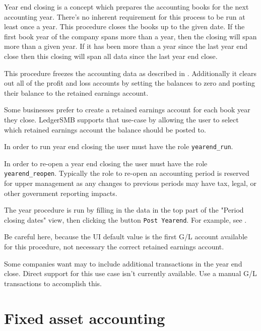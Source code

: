Year end closing is a concept which prepares the accounting books for the next
\gls{accounting year}. There's
no inherent requirement for this process to be run at least once a year. 
This procedure closes the books up to the given date. 
If the first book year of the company spans more than a year, 
then the closing will span more than a given year.
If it has been more than a year since the last year end close then
this closing will span all data since the last year end close.

This procedure freezes the accounting data as described in . Additionally it clears out all of the profit and loss accounts by
setting the balances to zero and posting their balance to the retained earnings account. 

Some businesses prefer to create a retained earnings account for each book year they
close. LedgerSMB supports that use-case by allowing the user to select which
retained earnings account the balance should be posted to.

In order to run year end closing the user must have the role  \texttt{yearend\_run}. 

In order to re-open a year end closing the user must have the role \texttt{yearend\_reopen}.
Typically the role to re-open an accounting period is reserved for upper management as any changes to previous periods may have tax, legal, or other government reporting impacts.

The year procedure is run by filling in the data in the top part of the "Period closing dates" view, then clicking the button \texttt{Post Yearend}. For example, see .

Be careful here, because the UI default value is the first G/L account available for this procedure, 
not necessary the correct retained earnings account.

Some companies want may to include additional transactions in the year end close.
Direct support for this use case isn't currently available.
Use a manual G/L transactions to accomplish this.


\section{Fixed asset accounting}
\label{sec-business-processes-accounting-fixed-asset-accounting}




